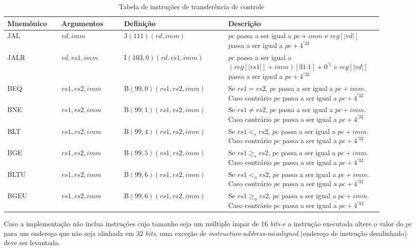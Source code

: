   \begin{table}
    \begin{tabular}{ |p{0.13\linewidth}||p{0.15\linewidth}|p{0.25\linewidth}|p{0.37\linewidth}| } 
      \hline
      Mnemônico & Argumentos & Definição & Descrição\\ \hline \hline

JAL & $rd, imm$ & J$(111)(rd, imm)$ & $pc$ passa a ser igual a $pc + imm$ e $reg[|rd|]$ passa a ser igual a $pc + 4^{'32}$\\ \hline
JALR & $rd, rs1, imm$ & I$(103, 0)(rd, rs1, imm)$ & $pc$ passa a ser igual a $(reg[|rs1|] + imm)[31\text{:}1] + 0^{'1}$ e $reg[|rd|]$ passa a ser igual a $pc + 4^{'32}$\\ \hline
BEQ & $rs1, rs2, imm$ & B$(99, 0)(rs1, rs2, imm)$ & Se $rs1 = rs2$, $pc$ passa a ser igual a $pc + imm$. Caso contrário $pc$ passa a ser igual a $pc + 4^{'32}$ \\ \hline
BNE & $rs1, rs2, imm$ & B$(99, 1)(rs1, rs2, imm)$ & Se $rs1 \neq rs2$, $pc$ passa a ser igual a $pc + imm$. Caso contrário $pc$ passa a ser igual a $pc + 4^{'32}$ \\ \hline
BLT & $rs1, rs2, imm$ & B$(99, 4)(rs1, rs2, imm)$ & Se $rs1 <_s rs2$, $pc$ passa a ser igual a $pc + imm$. Caso contrário $pc$ passa a ser igual a $pc + 4^{'32}$ \\ \hline
BGE & $rs1, rs2, imm$ & B$(99, 5)(rs1, rs2, imm)$ & Se $rs1 \geq_s rs2$, $pc$ passa a ser igual a $pc + imm$. Caso contrário $pc$ passa a ser igual a $pc + 4^{'32}$ \\ \hline
BLTU & $rs1, rs2, imm$ & B$(99, 6)(rs1, rs2, imm)$ & Se $rs1 <_u rs2$, $pc$ passa a ser igual a $pc + imm$. Caso contrário $pc$ passa a ser igual a $pc + 4^{'32}$ \\ \hline
BGEU & $rs1, rs2, imm$ & B$(99, 6)(rs1, rs2, imm)$ & Se $rs1 \geq_u rs2$, $pc$ passa a ser igual a $pc + imm$. Caso contrário $pc$ passa a ser igual a $pc + 4^{'32}$ \\ \hline

    \end{tabular}
  \caption{Tabela de instruções de transferência de controle \label{tab:jb32}}
  \end{table}

  Caso a implementação não inclua instruções cujo tamanho seja um múltiplo ímpar de 16 \emph{bits} e a
  instrução executada altere o valor do $pc$ para um endereço que não seja alinhada em 32 \emph{bits}, uma exceção
  de \emph{instruction-address-misaligned} (endereço de instrução desalinhado) deve ser levantada.
  
